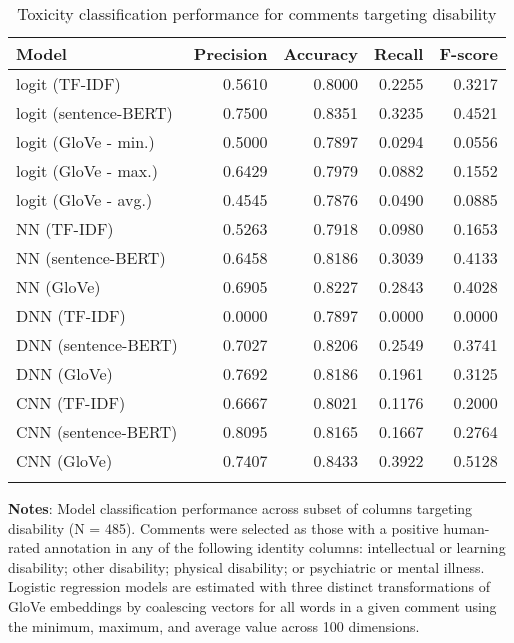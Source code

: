 \begin{table}[h]
	\caption{Toxicity classification performance for comments targeting disability \label{table:performance-disability}}
    \centering
	\begin{tabular}{lrrrr}
		\toprule
			Model &  Precision &  Accuracy &  Recall &  F-score \\
		\midrule
			\addlinespace{}
			\parbox{7.5cm}{logit (TF-IDF)} &    0.5610 &    0.8000 &  0.2255 &   0.3217 \\
			\addlinespace{}
			logit (sentence-BERT) &    0.7500 &    0.8351 &  0.3235 &   0.4521 \\
			\addlinespace{}
			logit (GloVe - min.) &     0.5000 &    0.7897 &  0.0294 &   0.0556 \\
			\addlinespace{}
			logit (GloVe - max.) &    0.6429 &    0.7979 &  0.0882 &   0.1552 \\
			\addlinespace{}
			logit (GloVe - avg.) &    0.4545 &    0.7876 &  0.0490 &   0.0885 \\
			\addlinespace{}
			NN (TF-IDF) &     0.5263 &    0.7918 &  0.0980 &   0.1653 \\
			\addlinespace{}
			NN (sentence-BERT) &      0.6458 &    0.8186 &  0.3039 &   0.4133 \\
			\addlinespace{}
			NN (GloVe) &     0.6905 &    0.8227 &  0.2843 &   0.4028 \\
			\addlinespace{}
			DNN (TF-IDF) &      0.0000 &    0.7897 &  0.0000 &   0.0000 \\
			\addlinespace{}
			DNN (sentence-BERT) &     0.7027 &    0.8206 &  0.2549 &   0.3741 \\
			\addlinespace{}
			DNN (GloVe) &     0.7692 &    0.8186 &  0.1961 &   0.3125 \\
			\addlinespace{}
			CNN (TF-IDF) &      0.6667 &    0.8021 &  0.1176 &   0.2000 \\
			\addlinespace{}
			CNN (sentence-BERT)  &    0.8095 &    0.8165 &  0.1667 &   0.2764 \\
			\addlinespace{}
			CNN (GloVe)  &     0.7407 &    0.8433 &  0.3922 &   0.5128 \\
	\bottomrule
	\addlinespace[1em]
	\end{tabular}
	\parbox{14.5cm}{\textbf{Notes}: Model classification performance across subset of columns targeting disability (N = 485). Comments were selected as those with a positive human-rated annotation in any of the following identity columns: intellectual or learning disability; other disability; physical disability; or psychiatric or mental illness. Logistic regression models are estimated with three distinct transformations of GloVe embeddings by coalescing vectors for all words in a given comment using the minimum, maximum, and average value across 100 dimensions.}
\end{table}